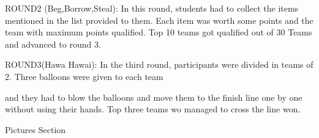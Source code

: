\documentclass[12pt, a4 paper]{article}
\begin{document}
\begin{center}
\begin{Large}
\begin{multicols}{2}
ROUND2 (Beg,Borrow,Steal): In this round, students had to collect the items mentioned in the list provided to them. Each item was worth some points and the team with maximum points qualified. Top 10 teams got qualified out of 30 Teams and advanced to round 3.

\columnbreak
  
\end{multicols}

\begin{multicols}{2}

\columnbreak
ROUND3(Hawa Hawai): In the third round, participants were divided in teams of 2. Three balloons were given to each team
  
\end{multicols} 

\begin{multicols}{2}
and they had to blow the balloons and move them to the finish line one by one without using their hands. Top three teams wo managed to cross the line won.

\columnbreak
  
\end{multicols} 

\begin{multicols}{2}

\columnbreak
  
\end{multicols} 

\end{Large} 
\end{center}

\newpage 


\begin{center}
\Huge Pictures Section
\end{center}

\newpage 
\end{document}

